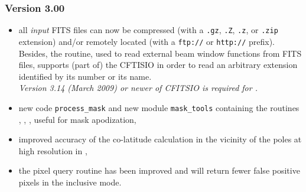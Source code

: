 \documentclass[12pt,twoside]{article}
\newcommand{\mylink}[2]{%
\latexhtml{\hyperlink{#1}{#2}}{\hyperref{#2}{}{}{#1}}}
\newcommand{\compresslist}{%
\setlength{\itemsep}{0ex}}{}
\begin{document}
{\subsubsection*{Version 3.00}
\label{sub:new3p00}
\begin{itemize}\compresslist
	\item all {\em input} FITS files can now be compressed (with a 
{\tt .gz}, {\tt .Z}, {\tt .z}, or {\tt .zip} 
extension) and/or remotely located (with a {\tt ftp://} or {\tt http://}
prefix). Besides, the  routine, used to read
external beam window functions from FITS files, supports (part of) the CFTISIO 
 in
order to read an arbitrary extension identified by its number or its name. \\
{\em Version 3.14 (March 2009) or newer of CFITSIO is required for .}
	\item%
new code {\tt process\_mask} and new module {\tt mask\_tools} containing the routines
, 
, 
,
 useful for mask apodization,
	\item improved accuracy of the co-latitude calculation in the vicinity
of the poles at high resolution in ,
	\item the pixel query routine
has been improved and will return fewer
false positive pixels in the 
inclusive
mode.
\end{itemize}

}
\end{document}

